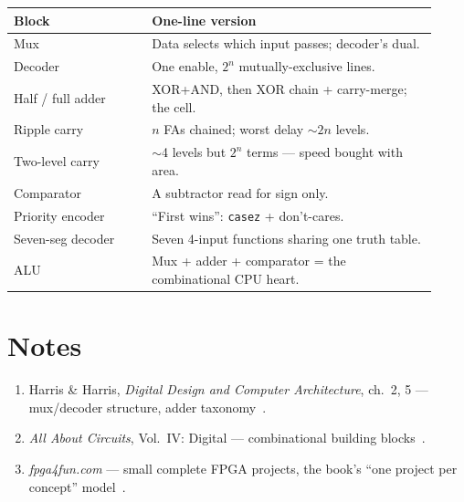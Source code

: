 \begin{center}\small
\begin{tabular}{@{}p{0.30\linewidth}p{0.62\linewidth}@{}}
\toprule
\textbf{Block} & \textbf{One-line version} \\ \midrule
Mux & Data selects which input passes; decoder's dual. \\
Decoder & One enable, $2^n$ mutually-exclusive lines. \\
Half / full adder & XOR+AND, then XOR chain + carry-merge; the cell. \\
Ripple carry & $n$ FAs chained; worst delay $\sim 2n$ levels. \\
Two-level carry & $\sim$4 levels but $2^n$ terms — speed bought with area. \\
Comparator & A subtractor read for sign only. \\
Priority encoder & ``First wins'': \texttt{casez} + don't-cares. \\
Seven-seg decoder & Seven 4-input functions sharing one truth table. \\
ALU & Mux + adder + comparator = the combinational CPU heart. \\
\bottomrule
\end{tabular}
\end{center}

\section*{Notes}
\begin{enumerate}
\item Harris \& Harris, \emph{Digital Design and Computer Architecture},
ch.\ 2, 5 — mux/decoder structure, adder taxonomy~\cite{ddca}.
\item \emph{All About Circuits}, Vol.~IV: Digital — combinational
building blocks~\cite{aacvol4}.
\item \emph{fpga4fun.com} — small complete FPGA projects, the book's
``one project per concept'' model~\cite{fpga4fun}.
\end{enumerate}

